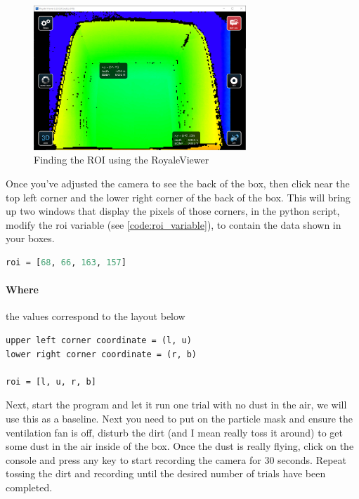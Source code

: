 \documentclass{article}
\begin{document}
			\begin{figure}[h]
				\includegraphics[width=8cm]{./images/royale_viewer_setup.png}
				\centering
				\caption{Finding the ROI using the RoyaleViewer}
				\label{fig:viewer}
			\end{figure}
		
			Once you've adjusted the camera to see the back of the box, then click near the top left corner and the lower right corner of the back of the box. This will bring up two windows that display the pixels of those corners, in the python script, modify the roi variable (see \ref{code:roi_variable}), to contain the data shown in your boxes.
			
			\label{code:roi_variable}
			\begin{lstlisting}[language=python]
roi = [68, 66, 163, 157]
			\end{lstlisting}
			
			\paragraph{Where} the values correspond to the layout below
			
			\begin{lstlisting}
upper left corner coordinate = (l, u)
lower right corner coordinate = (r, b)

roi = [l, u, r, b]
			\end{lstlisting}
		
			Next, start the program and let it run one trial with no dust in the air, we will use this as a baseline. Next you need to put on the particle mask and ensure the ventilation fan is off, disturb the dirt (and I mean really toss it around) to get some dust in the air inside of the box. Once the dust is really flying, click on the console and press any key to start recording the camera for 30 seconds. Repeat tossing the dirt and recording until the desired number of trials have been completed.
		
	\newpage
		
\end{document}
